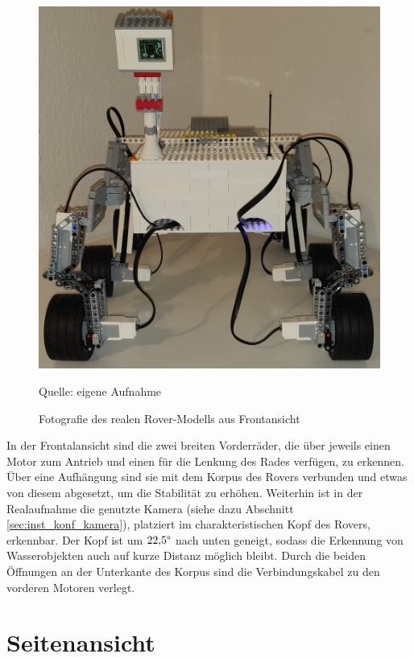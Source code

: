 \begin{figure}
	\centering
	\includegraphics[width=\textwidth]{../Images/20200429_front_01.jpg}
	\vspace{0.5em}
	\parbox[c]{0.8\linewidth}{\footnotesize
		\centering
		\vspace{1em}
		Quelle: eigene Aufnahme
	}
	\caption{Fotografie des realen Rover-Modells aus Frontansicht}
	\label{fig:roverfrontfoto}
\end{figure}

In der Frontalansicht sind die zwei breiten Vorderräder, die über jeweils einen Motor zum Antrieb und einen für die Lenkung des Rades verfügen, zu erkennen.
Über eine Aufhängung sind sie mit dem Korpus des Rovers verbunden und etwas von diesem abgesetzt, um die Stabilität zu erhöhen.
Weiterhin ist in der Realaufnahme die genutzte Kamera (siehe dazu Abschnitt \ref{sec:inst_konf_kamera}), platziert im charakteristischen Kopf des Rovers, erkennbar.
Der Kopf ist um $22{,}5 \degree$ nach unten geneigt, sodass die Erkennung von Wasserobjekten auch auf kurze Distanz möglich bleibt.
Durch die beiden Öffnungen an der Unterkante des Korpus sind die Verbindungskabel zu den vorderen Motoren verlegt.

\section{Seitenansicht}
\label{sec:seitenansicht}


